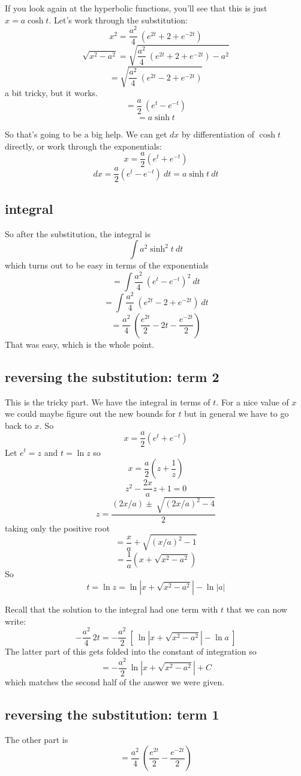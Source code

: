 \documentclass[11pt, oneside]{article}
\begin{document}
If you look again at the hyperbolic functions, you'll see that this is just $x = a \cosh t$.  Let's work through the substitution:
\[ x^2 = \frac{a^2}{4} \ (e^{2t} + 2 + e^{-2t}) \]
\[ \sqrt{x^2 - a^2} = \sqrt{ \frac{a^2}{4} \ (e^{2t} + 2 + e^{-2t}) - a^2} \]
\[ = \sqrt{ \frac{a^2}{4} \ (e^{2t} - 2 + e^{-2t})} \]
a bit tricky, but it works.
\[ = \frac{a}{2} \ (e^t - e^{-t}) \]
\[ = a \sinh t \]

So that's going to be a big help.  We can get $dx$ by differentiation of $\cosh t$ directly, or work through the exponentials:
\[ x = \frac{a}{2} (e^t + e^{-t}) \]
\[ dx = \frac{a}{2} (e^t - e^{-t}) \ dt = a \sinh t \ dt \]

\subsection*{integral}
So after the substitution, the integral is
\[ \int  a^2 \sinh^2 t \ dt \]
which turns out to be easy in terms of the exponentials
\[ = \int \frac{a^2}{4} \ (e^t - e^{-t})^2 \ dt \]
\[ = \int \frac{a^2}{4} \ (e^{2t} - 2 + e^{-2t}) \ dt \]
\[ = \frac{a^2}{4} \ (\frac{e^{2t}}{2} - 2t - \frac{e^{-2t}}{2} )  \]
That was easy, which is the whole point.

\subsection*{reversing the substitution:  term 2}
This is the tricky part.  We have the integral in terms of $t$.  For a nice value of $x$ we could maybe figure out the new bounds for $t$ but in general we have to go back to $x$.  So
\[ x = \frac{a}{2} (e^t + e^{-t}) \]
Let $e^t = z$ and $t = \ln z$ so
\[ x = \frac{a}{2} (z + \frac{1}{z}) \]
\[ z^2 - \frac{2x}{a} z + 1 = 0 \]
\[ z = \frac{(2x/a) \pm \ \sqrt{(2x/a)^2 - 4}}{2} \]
taking only the positive root
\[ = \frac{x}{a} + \sqrt{(x/a)^2 - 1} \]
\[ = \frac{1}{a} (x + \sqrt{x^2 - a^2}) \]
So
\[ t = \ln z = \ln | x + \sqrt{x^2 - a^2} | - \ln | a | \]

Recall that the solution to the integral had one term with $t$ that we can now write:
\[  - \frac{a^2}{4} \ 2t = - \frac{a^2}{2} \ [ \ \ln | x + \sqrt{x^2 - a^2} | - \ln a \ ] \]
The latter part of this gets folded into the constant of integration so
\[ = - \frac{a^2}{2} \ \ln | x + \sqrt{x^2 - a^2} | + C \]
which matches the second half of the answer we were given.  

\subsection*{reversing the substitution:  term 1}
The other part is
\[ = \frac{a^2}{4} \ (\frac{e^{2t}}{2} - \frac{e^{-2t}}{2} )  \]
\end{document}
